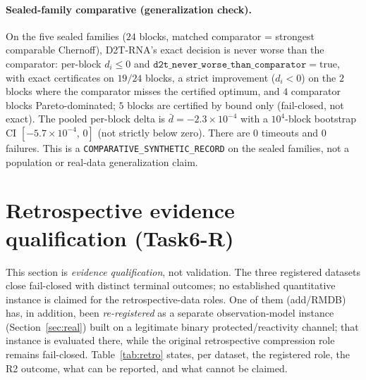 \documentclass[11pt]{article}
\begin{document}
\paragraph{Sealed-family comparative (generalization check).}
On the five sealed families ($24$ blocks, matched comparator = strongest comparable Chernoff), D2T-RNA's
exact decision is never worse than the comparator: per-block $d_i \le 0$ and
$\texttt{d2t\_never\_worse\_than\_comparator}=\mathrm{true}$, with exact certificates on $19/24$ blocks,
a strict improvement ($d_i<0$) on the $2$ blocks where the comparator misses the certified optimum, and
$4$ comparator blocks Pareto-dominated; $5$ blocks are certified by bound only (fail-closed, not exact).
The pooled per-block delta is $\bar d=-2.3\times10^{-4}$ with a $10^4$-block bootstrap
CI $[-5.7\times10^{-4},\,0]$ (not strictly below zero). There are $0$ timeouts and $0$ failures. This is
a \texttt{COMPARATIVE\_SYNTHETIC\_RECORD} on the sealed families, not a population or real-data
generalization claim.

\section{Retrospective evidence qualification (Task6-R)}\label{sec:retro}
This section is \emph{evidence qualification}, not validation. The three registered datasets close
fail-closed with distinct terminal outcomes; no established quantitative instance is claimed for the
retrospective-data roles. One of them (add/RMDB) has, in addition, been \emph{re-registered} as a
separate observation-model instance (Section~\ref{sec:real}) built on a legitimate binary
protected/reactivity channel; that instance is evaluated there, while the original retrospective
compression role remains fail-closed. Table~\ref{tab:retro} states, per dataset, the registered role,
the R2 outcome, what can be reported, and what cannot be claimed.
\end{document}
